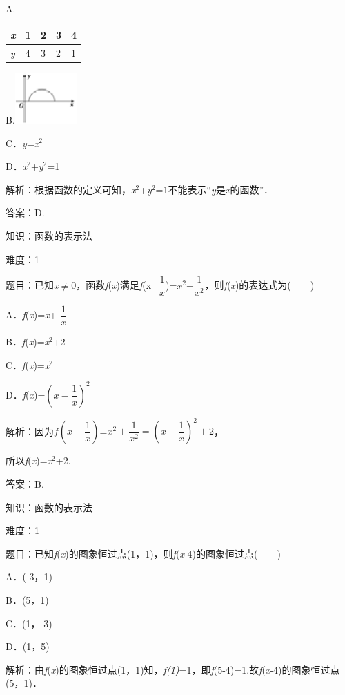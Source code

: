 \documentclass{article} %
\begin{document}
A.\textit{}

\begin{tabular}{|p{0.2in}|p{0.2in}|p{0.2in}|p{0.2in}|p{0.2in}|} \hline
\textit{x} & 1\textit{} & 2\textit{} & 3\textit{} & 4 \\ \hline
\textit{y} & 4\textit{} & 3\textit{} & 2\textit{} & 1 \\ \hline
\end{tabular}

B.\includegraphics*[width=0.93in, height=0.77in, keepaspectratio=false]{image22}

C．\textit{y}=\textit{x}${}^{2}$

D．\textit{x}${}^{2}$+\textit{y}${}^{2}$=1

解析：根据函数的定义可知，\textit{x}${}^{2}$+\textit{y}${}^{2}$=1不能表示``\textit{y}是\textit{x}的函数''．

答案：D.

知识：函数的表示法

难度：1

题目：已知\textit{x}$\mathrm{\neq}$0，函数\textit{f}(\textit{x})满足\textit{f}(x$-\dfrac{1}{x}$)=$x^{2}$+$\dfrac{1}{x^{2}}$，则\textit{f}(\textit{x})的表达式为(　　)

A．\textit{f}(\textit{x})=\textit{x}+ $\dfrac{1}{x}$ 

B．\textit{f}(\textit{x})=\textit{x}${}^{2}$+2

C．\textit{f}(\textit{x})=\textit{x}${}^{2}$   

D．\textit{f}(\textit{x})=$(x-\dfrac{1}{x})^{2}$

解析：因为$f(x-\dfrac{1}{x})$=$x^{2}+\dfrac{1}{x^{2}}=(x-\dfrac{1}{x})^{2}+2$，

所以\textit{f}(\textit{x})=\textit{x}${}^{2}$+2.

答案：B.

知识：函数的表示法

难度：1

题目：已知\textit{f}(\textit{x})的图象恒过点(1，1)，则\textit{f}(\textit{x}-4)的图象恒过点(　　)

A．(-3，1)   

B．(5，1)

C．(1，-3)   

D．(1，5)

解析：由\textit{f}(\textit{x})的图象恒过点(1，1)知，\textit{f(1)}=1，即\textit{f}(5-4)=1.故\textit{f}(\textit{x}-4)的图象恒过点(5，1)．
\end{document}
